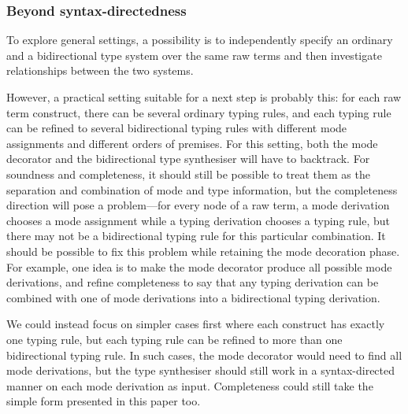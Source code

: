 \subsubsection{Beyond syntax-directedness}


To explore general settings, a possibility is to independently specify an ordinary and a bidirectional type system over the same raw terms and then investigate relationships between the two systems.

However, a practical setting suitable for a next step is probably this: for each raw term construct, there can be several ordinary typing rules, and each typing rule can be refined to several bidirectional typing rules with different mode assignments and different orders of premises.
For this setting, both the mode decorator and the bidirectional type synthesiser will have to backtrack.
For soundness and completeness, it should still be possible to treat them as the separation and combination of mode and type information, but the completeness direction will pose a problem---for every node of a raw term, a mode derivation chooses a mode assignment while a typing derivation chooses a typing rule, but there may not be a bidirectional typing rule for this particular combination.
It should be possible to fix this problem while retaining the mode decoration phase.
For example, one idea is to make the mode decorator produce all possible mode derivations, and refine completeness to say that any typing derivation can be combined with one of mode derivations into a bidirectional typing derivation.

We could instead focus on simpler cases first where each construct has exactly one typing rule, but each typing rule can be refined to more than one bidirectional typing rule.
In such cases, the mode decorator would need to find all mode derivations, but the type synthesiser should still work in a syntax-directed manner on each mode derivation as input.
Completeness could still take the simple form presented in this paper too.

